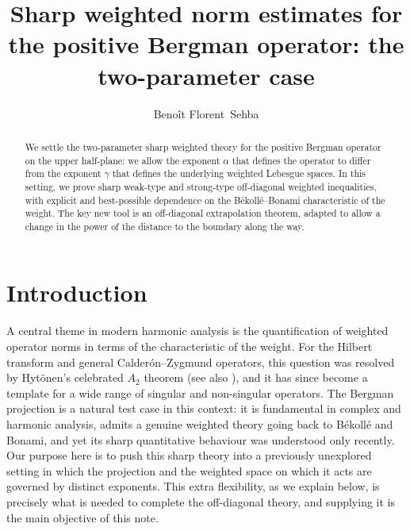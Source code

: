 \documentclass[a4paper,11pt,intlimits,oneside]{amsart}
\theoremstyle{definition}
\numberwithin{equation}{section}
\theoremstyle{definition}
\begin{document}
\title[Sharp weighted norm estimates for the Bergman operator]{Sharp weighted norm estimates for the positive Bergman operator: the two-parameter case}
\author{}
\author[Beno\^it F.\ Sehba]{Beno\^it Florent\ Sehba}
\address{Department of Mathematics, University of Ghana, P.O. Box LG 62, Legon, Accra, Ghana.}


\date{}

\begin{abstract}
We settle the two-parameter sharp weighted theory for the positive Bergman operator on the upper half-plane: we allow the exponent $\alpha$ that defines the operator to differ from the exponent $\gamma$ that defines the underlying weighted Lebesgue spaces. In this setting, we prove sharp weak-type and strong-type off-diagonal weighted inequalities, with explicit and best-possible dependence on the B\'ekoll\'e--Bonami characteristic of the weight. The key new tool is an off-diagonal extrapolation theorem, adapted to allow a change in the power of the distance to the boundary along the way. 
\end{abstract}

\maketitle

\section{Introduction}

A central theme in modern harmonic analysis is the quantification of weighted operator norms in terms of the characteristic of the weight. For the Hilbert transform and general Calder\'on--Zygmund operators, this question was resolved by Hyt\"onen's celebrated $A_2$ theorem \cite{Hytonen} (see also \cite{Cruzetal,DGPP,HyLaPerez,HyPerez,Laceyetal,Laceyetal2,Lerner,Petermichl,PetVol}), and it has since become a template for a wide range of singular and non-singular operators. The Bergman projection is a natural test case in this context: it is fundamental in complex and harmonic analysis, admits a genuine weighted theory going back to B\'ekoll\'e and Bonami, and yet its sharp quantitative behaviour was understood only recently. Our purpose here is to push this sharp theory into a previously unexplored setting in which the projection and the weighted space on which it acts are governed by distinct exponents. This extra flexibility, as we explain below, is precisely what is needed to complete the off-diagonal theory, and supplying it is the main objective of this note.
\end{document}
